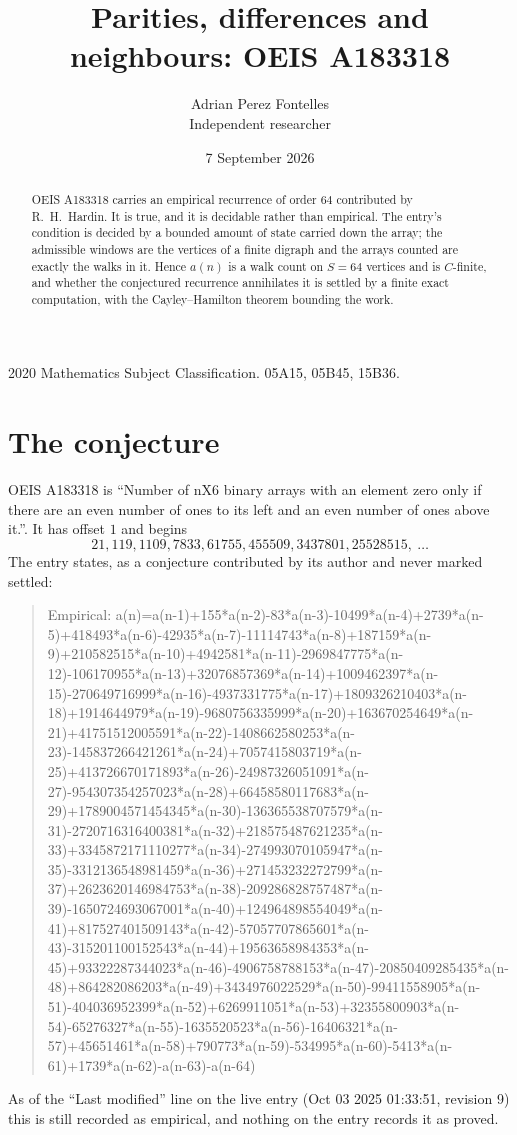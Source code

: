 \documentclass[11pt,a4paper]{article}
\title{Parities, differences and neighbours: OEIS A183318}
\author{Adrian Perez Fontelles\\ \small Independent researcher}
\date{7 September 2026}
\theoremstyle{plain}
\theoremstyle{definition}
\begin{document}
\maketitle

\begin{abstract}
OEIS A183318 carries an empirical recurrence of order $64$ contributed by R.~H.~Hardin. It is
true, and it is decidable rather than empirical. The entry's condition is decided by a bounded amount of state carried down the array; the
admissible windows are the vertices of a finite digraph and the arrays counted are exactly the
walks in it. Hence $a(n)$ is a walk count on $S=64$ vertices and is $C$-finite, and whether the
conjectured recurrence annihilates it is settled by a finite exact computation, with the
Cayley--Hamilton theorem bounding the work.
\end{abstract}

\noindent\small 2020 Mathematics Subject Classification. 05A15, 05B45, 15B36.\normalsize

\section{The conjecture}

OEIS A183318 is ``Number of nX6 binary arrays with an element zero only if there are an even number of ones to its left and an even number of ones above it.''. It has offset $1$ and begins
\[
21, 119, 1109, 7833, 61755, 455509, 3437801, 25528515,\ \dots
\]
The entry states, as a conjecture contributed by its author and never marked settled:
\begin{quote}
Empirical: a(n)=a(n-1)+155*a(n-2)-83*a(n-3)-10499*a(n-4)+2739*a(n-5)+418493*a(n-6)-42935*a(n-7)-11114743*a(n-8)+187159*a(n-9)+210582515*a(n-10)+4942581*a(n-11)-2969847775*a(n-12)-106170955*a(n-13)+32076857369*a(n-14)+1009462397*a(n-15)-270649716999*a(n-16)-4937331775*a(n-17)+1809326210403*a(n-18)+1914644979*a(n-19)-9680756335999*a(n-20)+163670254649*a(n-21)+41751512005591*a(n-22)-1408662580253*a(n-23)-145837266421261*a(n-24)+7057415803719*a(n-25)+413726670171893*a(n-26)-24987326051091*a(n-27)-954307354257023*a(n-28)+66458580117683*a(n-29)+1789004571454345*a(n-30)-136365538707579*a(n-31)-2720716316400381*a(n-32)+218575487621235*a(n-33)+3345872171110277*a(n-34)-274993070105947*a(n-35)-3312136548981459*a(n-36)+271453232272799*a(n-37)+2623620146984753*a(n-38)-209286828757487*a(n-39)-1650724693067001*a(n-40)+124964898554049*a(n-41)+817527401509143*a(n-42)-57057707865601*a(n-43)-315201100152543*a(n-44)+19563658984353*a(n-45)+93322287344023*a(n-46)-4906758788153*a(n-47)-20850409285435*a(n-48)+864282086203*a(n-49)+3434976022529*a(n-50)-99411558905*a(n-51)-404036952399*a(n-52)+6269911051*a(n-53)+32355800903*a(n-54)-65276327*a(n-55)-1635520523*a(n-56)-16406321*a(n-57)+45651461*a(n-58)+790773*a(n-59)-534995*a(n-60)-5413*a(n-61)+1739*a(n-62)-a(n-63)-a(n-64)
\end{quote}
As of the ``Last modified'' line on the live entry (Oct 03 2025 01:33:51, revision 9) this is still
recorded as empirical, and nothing on the entry records it as proved.
\end{document}
